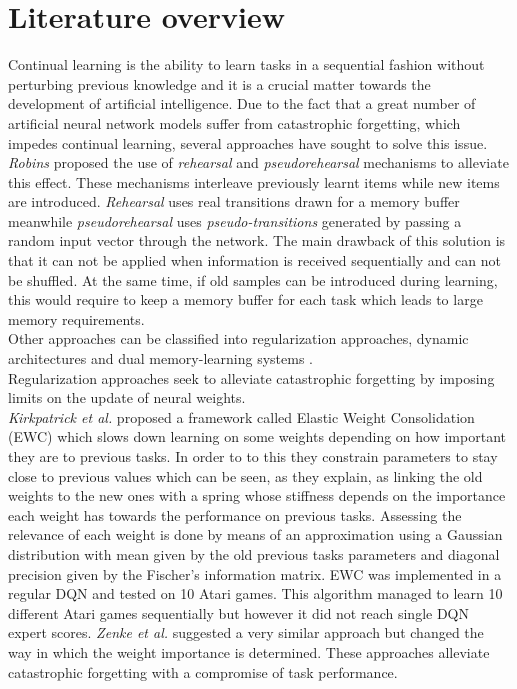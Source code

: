 \documentclass{article}
\begin{document}
\section{Literature overview}
Continual learning is the ability to learn tasks in a sequential fashion without perturbing previous knowledge and it is a crucial matter towards the development of artificial intelligence. Due to the fact that a great number of artificial neural network models suffer from catastrophic forgetting, which impedes continual learning, several approaches have sought to solve this issue.\\
\newline
\textit{Robins} \citep{RobinsConsolidationBrain} proposed the use of \textit{rehearsal} and \textit{pseudorehearsal} mechanisms to alleviate this effect. These mechanisms interleave previously learnt items while new items are introduced. \textit{Rehearsal} uses real transitions drawn for a memory buffer meanwhile \textit{pseudorehearsal} uses \textit{pseudo-transitions} generated by passing a random input vector through the network. The main drawback of this solution is that it can not be applied when information is received sequentially and can not be shuffled. At the same time, if old samples can be introduced during learning, this would require to keep a memory buffer for each task which leads to large memory requirements.\\
Other approaches can be classified into regularization approaches, dynamic architectures and dual memory-learning systems \citep{Parisi2018ContinualReview}.\\
Regularization approaches seek to alleviate catastrophic forgetting by imposing limits on the update of neural weights.\\ \textit{Kirkpatrick et al.} \citep{Kirkpatrick2017OvercomingNetworks.} proposed a framework called Elastic Weight Consolidation (EWC) which slows down learning on some weights depending on how important they are to previous tasks. In order to to this they constrain parameters to stay close to previous values which can be seen, as they explain, as linking the old weights to the new ones with a spring whose stiffness depends on the importance each weight has towards the performance on previous tasks. Assessing the relevance of each weight is done by means of an approximation using a Gaussian distribution with mean given by the old previous tasks parameters and diagonal precision given by the Fischer's information matrix. EWC was implemented in a regular DQN and tested on 10 Atari games. This algorithm managed to learn  10 different Atari games sequentially but however it did not reach single DQN expert scores. \textit{Zenke et al.} \citep{Zenke2017ContinualIntelligence} suggested a very similar approach but changed the way in which the weight importance is determined. These approaches alleviate catastrophic forgetting with a compromise of task performance.\\
\end{document}
